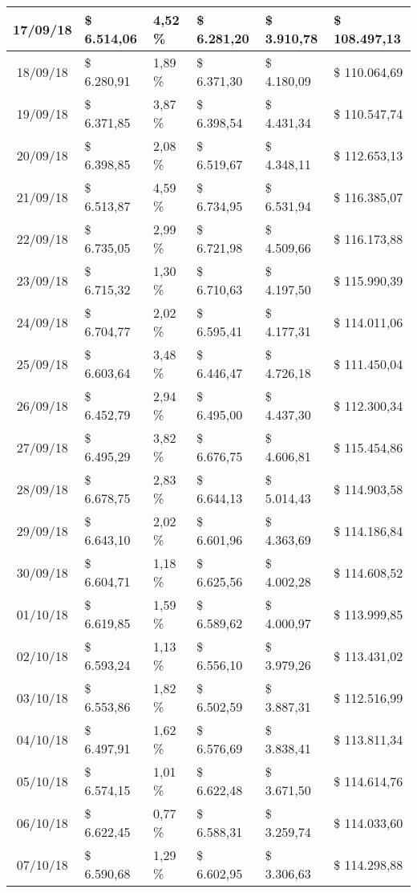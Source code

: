 \begin{small}
\begin{longtable}{|c|l|l|l|l|l|}
17/09/18 & \$ 6.514,06 & 4,52 \% & \$ 6.281,20 & \$ 3.910,78 & \$ 108.497,13 \\ \hline
18/09/18 & \$ 6.280,91 & 1,89 \% & \$ 6.371,30 & \$ 4.180,09 & \$ 110.064,69 \\ \hline
19/09/18 & \$ 6.371,85 & 3,87 \% & \$ 6.398,54 & \$ 4.431,34 & \$ 110.547,74 \\ \hline
20/09/18 & \$ 6.398,85 & 2,08 \% & \$ 6.519,67 & \$ 4.348,11 & \$ 112.653,13 \\ \hline
21/09/18 & \$ 6.513,87 & 4,59 \% & \$ 6.734,95 & \$ 6.531,94 & \$ 116.385,07 \\ \hline
22/09/18 & \$ 6.735,05 & 2,99 \% & \$ 6.721,98 & \$ 4.509,66 & \$ 116.173,88 \\ \hline
23/09/18 & \$ 6.715,32 & 1,30 \% & \$ 6.710,63 & \$ 4.197,50 & \$ 115.990,39 \\ \hline
24/09/18 & \$ 6.704,77 & 2,02 \% & \$ 6.595,41 & \$ 4.177,31 & \$ 114.011,06 \\ \hline
25/09/18 & \$ 6.603,64 & 3,48 \% & \$ 6.446,47 & \$ 4.726,18 & \$ 111.450,04 \\ \hline
26/09/18 & \$ 6.452,79 & 2,94 \% & \$ 6.495,00 & \$ 4.437,30 & \$ 112.300,34 \\ \hline
27/09/18 & \$ 6.495,29 & 3,82 \% & \$ 6.676,75 & \$ 4.606,81 & \$ 115.454,86 \\ \hline
28/09/18 & \$ 6.678,75 & 2,83 \% & \$ 6.644,13 & \$ 5.014,43 & \$ 114.903,58 \\ \hline
29/09/18 & \$ 6.643,10 & 2,02 \% & \$ 6.601,96 & \$ 4.363,69 & \$ 114.186,84 \\ \hline
30/09/18 & \$ 6.604,71 & 1,18 \% & \$ 6.625,56 & \$ 4.002,28 & \$ 114.608,52 \\ \hline
01/10/18 & \$ 6.619,85 & 1,59 \% & \$ 6.589,62 & \$ 4.000,97 & \$ 113.999,85 \\ \hline
02/10/18 & \$ 6.593,24 & 1,13 \% & \$ 6.556,10 & \$ 3.979,26 & \$ 113.431,02 \\ \hline
03/10/18 & \$ 6.553,86 & 1,82 \% & \$ 6.502,59 & \$ 3.887,31 & \$ 112.516,99 \\ \hline
04/10/18 & \$ 6.497,91 & 1,62 \% & \$ 6.576,69 & \$ 3.838,41 & \$ 113.811,34 \\ \hline
05/10/18 & \$ 6.574,15 & 1,01 \% & \$ 6.622,48 & \$ 3.671,50 & \$ 114.614,76 \\ \hline
06/10/18 & \$ 6.622,45 & 0,77 \% & \$ 6.588,31 & \$ 3.259,74 & \$ 114.033,60 \\ \hline
07/10/18 & \$ 6.590,68 & 1,29 \% & \$ 6.602,95 & \$ 3.306,63 & \$ 114.298,88 \\ \hline

\end{longtable}
\end{small}
